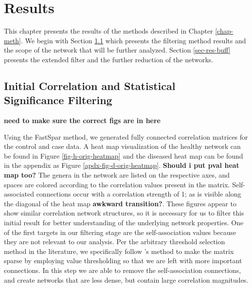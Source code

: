 
\chapter{Results} \label{chap-results}

\bigskip

This chapter presents the results of the methods described in Chapter \ref{chap-meth}. We begin with Section \ref{res-cor-stat} which presents the filtering method results and the scope of the network that will be further analyzed. Section \ref{sec-res-buff} presents the extended filter and the further reduction of the networks.





\section[Initial Correlation and Statistical Significance Filtering]{Initial Correlation and Statistical \\ Significance Filtering}\label{res-cor-stat}
\textbf{need to make sure the correct figs are in here}

Using the FastSpar method, we generated fully connected correlation matrices for the control and case data. A heat map visualization of the healthy network can be found in Figure \ref{fig-h-orig-heatmap} and the diseased heat map can be found in the appendix as Figure \ref{apdx-fig-d-orig-heatmap}.  \textbf{ Should i put pval heat map too?} The genera in the network are listed on the respective axes, and spaces are colored according to the correlation values present in the matrix. Self-associated connections occur with a correlation strength of 1; as is visible along the diagonal of the heat map \textbf{awkward transition?}. These figures appear to show similar correlation network structures, so it is necessary for us to filter this initial result for better understanding of the underlying network properties. One of the first targets in our filtering stage are the self-association values because they are not relevant to our analysis. Per the arbitrary threshold selection method in the literature, we specifically follow \citet{Friedman2012}'s method to make the matrix sparse by employing value thresholding so that we are left with more important connections. In this step we are able to remove the self-association connections, and create networks that are less dense, but contain large correlation magnitudes.

